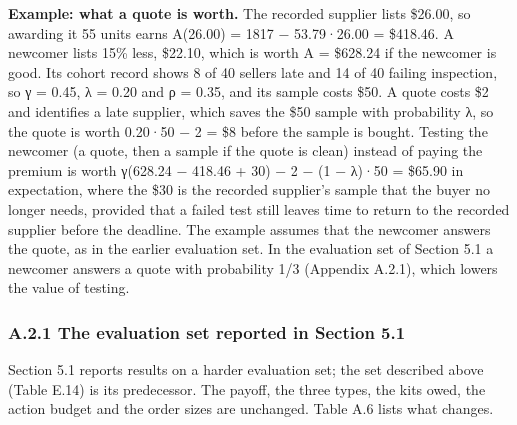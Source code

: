 \textbf{Example: what a quote is worth.} The recorded supplier lists \$26.00, so awarding it 55 units
earns A(26.00) = 1817 − 53.79·26.00 = \$418.46. A newcomer lists 15\% less, \$22.10, which is worth A = \$628.24
if the newcomer is good. Its cohort record shows 8 of 40 sellers late and 14 of 40 failing inspection, so γ = 0.45,
λ = 0.20 and ρ = 0.35, and its sample costs \$50. A quote costs \$2 and identifies a late supplier,
which saves the \$50 sample with probability λ, so the quote is worth 0.20·50 − 2 = \$8 before the sample is bought.
Testing the newcomer (a quote, then a sample if the quote is clean) instead of paying the premium is worth
γ(628.24 − 418.46 + 30) − 2 − (1 − λ)·50 = \$65.90 in expectation, where the \$30 is the recorded
supplier's sample that the buyer no longer needs, provided that a failed test still leaves time to return to
the recorded supplier before the deadline. The example assumes that the newcomer answers the quote, as in the earlier evaluation set. In the
evaluation set of Section 5.1 a newcomer answers a quote with probability 1/3 (Appendix A.2.1), which lowers the value
of testing.

\subsubsection{A.2.1 The evaluation set reported in Section 5.1}\label{a.2.1-the-evaluation-set-reported-in-section-5.1}

Section 5.1 reports results on a harder evaluation set; the set described above (Table E.14) is its predecessor.
The payoff, the three types, the kits owed, the action budget and the order sizes are unchanged. Table A.6 lists
what changes.

